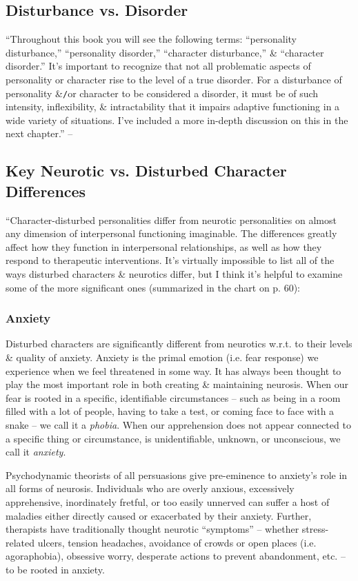 \documentclass{article}
\numberwithin{equation}{section}
\begin{document}
\subsection{Disturbance vs. Disorder}
``Throughout this book you will see the following terms: ``personality disturbance,'' ``personality disorder,'' ``character disturbance,'' \& ``character disorder.'' It's important to recognize that not all problematic aspects of personality or character rise to the level of a true disorder. For a disturbance of personality \&\texttt{/}or character to be considered a disorder, it must be of such intensity, inflexibility, \& intractability that it impairs adaptive functioning in a wide variety of situations. I've included a more in-depth discussion on this in the next chapter.'' -- \cite[p. 27]{Simon2011}

\subsection{Key Neurotic vs. Disturbed Character Differences}
``Character-disturbed personalities differ from neurotic personalities on almost any dimension of interpersonal functioning imaginable. The differences greatly affect how they function in interpersonal relationships, as well as how they respond to therapeutic interventions. It's virtually impossible to list all of the ways disturbed characters \& neurotics differ, but I think it's helpful to examine some of the more significant ones (summarized in the chart on p. 60):

\subsubsection{Anxiety}
Disturbed characters are significantly different from neurotics w.r.t. to their levels \& quality of anxiety. Anxiety is the primal emotion (i.e. fear response) we experience when we feel threatened in some way. It has always been thought to play the most important role in both creating \& maintaining neurosis. When our fear is rooted in a specific, identifiable circumstances -- such as being in a room filled with a lot of people, having to take a test, or coming face to face with a snake -- we call it a \textit{phobia}. When our apprehension does not appear connected to a specific thing or circumstance, is unidentifiable, unknown, or unconscious, we call it \textit{anxiety}.
	
Psychodynamic theorists of all persuasions give pre-eminence to anxiety's role in all forms of neurosis. Individuals who are overly anxious, excessively apprehensive, inordinately fretful, or too easily unnerved can suffer a host of maladies either directly caused or exacerbated by their anxiety. Further, therapists have traditionally thought neurotic ``symptoms'' -- whether stress-related ulcers, tension headaches, avoidance of crowds or open places (i.e. agoraphobia), obsessive worry, desperate actions to prevent abandonment, etc. -- to be rooted in anxiety.
\end{document}
